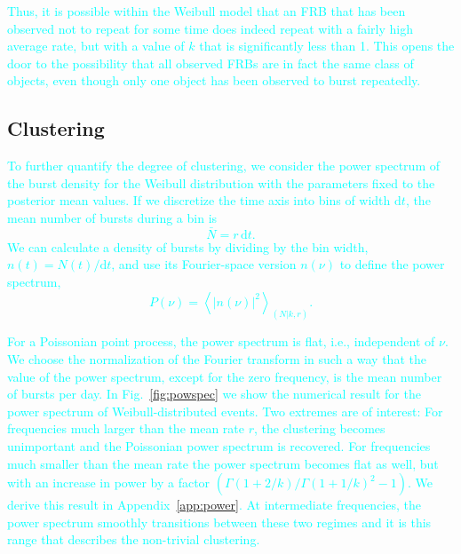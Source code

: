 \documentclass[fleqn,usenatbib]{mnras}
\newcommand{\new}[1]{\textcolor{cyan}{#1}}
\begin{document}
\new{Thus, it is possible within the Weibull model that an FRB that has been observed not to repeat for some time does indeed repeat with a fairly high average rate, but with a value of $k$ that is significantly less than 1. This opens the door to the possibility that all observed FRBs are in fact the same class of objects, even though only one object has been observed to burst repeatedly.}


\subsection{Clustering}
\label{sec:clustering}

\new{To further quantify the degree of clustering, we consider the power spectrum of the burst density for the Weibull distribution with the parameters fixed to the posterior mean values. If we discretize the time axis into bins of width $\mathrm{d}t$, the mean number of bursts during a bin is
\begin{equation}
	\bar{N} = r\,\mathrm{d}t.
\end{equation}
We can calculate a density of bursts by dividing by the bin width, $n(t) = N(t)/\mathrm{d}t$, and use its Fourier-space version $n(\nu)$ to define the power spectrum,
\begin{equation}
	P(\nu) = \left< \left|n(\nu)\right|^2 \right>_{(N|k,r)}.
\end{equation}}

\new{For a Poissonian point process, the power spectrum is flat, i.e., independent of $\nu$. We choose the normalization of the Fourier transform in such a way that the value of the power spectrum, except for the zero frequency, is the mean number of bursts per day. In Fig.~\ref{fig:powspec} we show the numerical result for the power spectrum of Weibull-distributed events. Two extremes are of interest: For frequencies much larger than the mean rate $r$, the clustering becomes unimportant and the Poissonian power spectrum is recovered. For frequencies much smaller than the mean rate the power spectrum becomes flat as well, but with an increase in power by a factor $(\Gamma(1 + 2/k)/\Gamma(1 + 1/k)^2 - 1)$. We derive this result in Appendix~\ref{app:power}. At intermediate frequencies, the power spectrum smoothly transitions between these two regimes and it is this range that describes the non-trivial clustering.}
\end{document}
